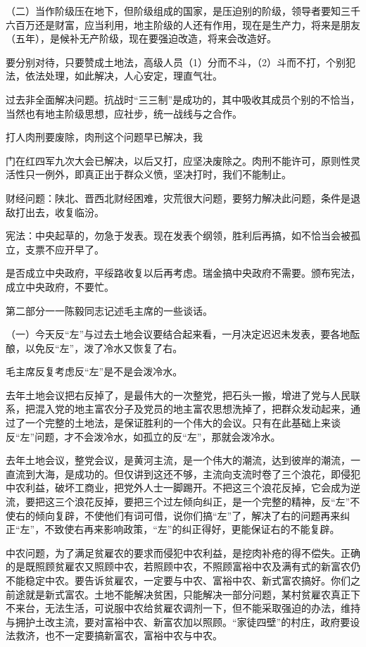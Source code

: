 （二）当作阶级压在地下，但阶级组成的国家，是压迫别的阶级，领导者要知三千六百万还是财富，应当利用，地主阶级的人还有作用，现在是生产力，将来是朋友（五年），是候补无产阶级，现在要强迫改造，将来会改造好。

要分别对待，只要赞成土地法，高级人员（1）分而不斗，（2）斗而不打，个别犯法，依法处理，如此解决，人心安定，理直气壮。

过去非全面解决问题。抗战时“三三制”是成功的，其中吸收其成员个别的不恰当，当然也有地主阶级思想，应社步，统一战线与之合作。

打人肉刑要废除，肉刑这个问题早已解决，我{门在红四军九次大会已解决，以后又打，应坚决废除之。肉刑不能许可，原则性灵活性只一例外，即真正出于群众义愤，坚决打时，我们不能制止。

财经问题：陕北、晋西北财经困难，灾荒很大问题，要努力解决此问题，条件是退敌打出去，收复临汾。

宪法：中央起草的，勿急于发表。现在发表个纲领，胜利后再搞，如不恰当会被孤立，支票不应开早了。

是否成立中央政府，平绥路收复以后再考虑。瑞金搞中央政府不需要。颁布宪法，成立中央政府，不要忙。

第二部分一一陈毅同志记述毛主席的一些谈话。

（一）今天反“左”与过去土地会议要结合起来看，一月决定迟迟未发表，要各地酝酿，以免反“左”，泼了冷水又恢复了右。

毛主席反复考虑反“左”是不是会泼冷水。

去年土地会议把右反掉了，是最伟大的一次整党，把石头一搬，增进了党与人民联系，把混入党的地主富农分子及党员的地主富农思想洗掉了，把群众发动起来，通过了一个完整的土地法，是保证胜利的一个伟大的会议。只有在此基础上来谈反“左”问题，才不会泼冷水，如孤立的反“左”，那就会泼冷水。

去年土地会议，整党会议，是黄河主流，是一个伟大的潮流，达到彼岸的潮流，一直流到大海，是成功的。但仅讲到这还不够，主流向支流时卷了三个浪花，即侵犯中农利益，破坏工商业，把党外人士一脚踢开。不把这三个浪花反掉，它会成为逆流，要把这三个浪花反掉，要把三个过左倾向纠正，是一个完整的精神，反“左”不使右的倾向复辟，不使他们有词可借，说你们搞“左”了，解决了右的问题再来纠正“左”，不致使右再来影响政策，“左”的纠正得好，更能保证右的不能复辟。

中农问题，为了满足贫雇农的要求而侵犯中农利益，是挖肉补疮的得不偿失。正确的是既照顾贫雇农又照顾中农，若照顾中农，不照顾富裕中农及满有式的新富农仍不能稳定中农。要告诉贫雇农，一定要与中农、富裕中农、新式富农搞好。你们之前途就是新式富农。土地不能解决贫困，只能解决一部分问题，某村贫雇农真正下不来台，无法生活，可说服中农给贫雇农调剂一下，但不能采取强迫的办法，维持与拥护土改主流，要对富裕中农、新富农加以照顾。“家徒四壁”的村庄，政府要设法救济，也不一定要搞新富农，富裕中农与中农。

}
